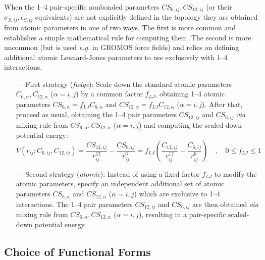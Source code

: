 \documentclass[10pt,a4paper,openany]{memoir}
\numberwithin{equation}{section}
\begin{document}
When the 1--4 pair-specific nonbonded parameters $CS_{6,ij},CS_{12,ij}$ (or their $\sigma_{S,ij},\epsilon_{S,ij}$ equivalents) are not explicitly defined in the topology they are obtained from atomic parameters in one of two ways.
The first is more common and establishes a simple mathematical rule for computing them.
The second is more uncommon (but is used \textit{e.g.} in GROMOS force fields) and relies on defining additional atomic Lennard-Jones parameters to use exclusively with 1--4 interactions. 
\begin{itemize}
\item [---] First strategy (\textit{fudge}): Scale down the standard
  atomic parameters $C_{6,\alpha},C_{12,\alpha}$ ($\alpha=i,j$) by a
  common factor $f_{LJ}$, obtaining 1--4 atomic parameters
  $CS_{6,\alpha} = f_{LJ}C_{6,\alpha}$ and
  $CS_{12,\alpha} = f_{LJ}C_{12,\alpha}$ ($\alpha=i,j$). After that,
  proceed as usual, obtaining the 1--4 pair parameters $CS_{12,ij}$
  and $CS_{6,ij}$ \textit{via} mixing rule from
  $CS_{6,\alpha},CS_{12,\alpha}$ ($\alpha=i,j$) and computing the
  scaled-down potential energy:
  \begin{equation}
    \label{eq:fudge-LJ}
    V(r_{ij};C_{6,ij},C_{12,ij}) =   \frac{CS_{12,ij}}{r_{ij}^{12}} - \frac{CS_{6,ij}}{r_{ij}^6} = f_{LJ} \left( \frac{C_{12,ij}}{r_{ij}^{12}} - \frac{C_{6,ij}}{r_{ij}^6} \right) \quad , \quad 0 \leq f_{LJ} \leq 1
  \end{equation}
\item [---] Second strategy (\textit{atomic}): Instead of using a
  fixed factor $f_{LJ}$ to modify the atomic parameters, specify an
  independent additional set of atomic parameters $CS_{6,\alpha}$ and
  $CS_{12,\alpha}$ ($\alpha=i,j$) which are exclusive to 1--4
  interactions. The 1--4 pair parameters $CS_{12,ij}$ and $CS_{6,ij}$
  are then obtained \textit{via} mixing rule from
  $CS_{6,\alpha},CS_{12,\alpha}$ ($\alpha=i,j$), resulting in a
  pair-specific scaled-down potential energy.
\end{itemize}

\subsection{Choice of Functional Forms}
\label{sec:choice-of-functional-forms}
\end{document}

